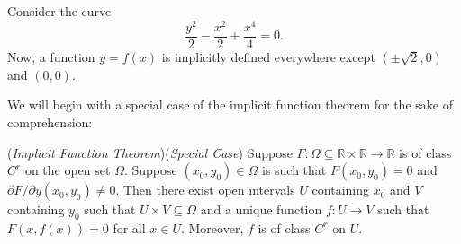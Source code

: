 \documentclass[11pt]{article}
\theoremstyle{definition}
\newcommand{\R}{\mathbb{R}}                      %
\newcommand{\dell}{\partial}
\begin{document}
\ex Consider the curve
$$
\frac{y^2}{2}-\frac{x^2}{2}+\frac{x^4}{4}=0.
$$
Now, a function $y=f(x)$ is implicitly defined everywhere except $(\pm \sqrt{2},0)$ and $(0,0)$.

We will begin with a special case of the implicit function theorem for the sake of comprehension:

\begin{shaded}
\theorem (\textit{Implicit Function Theorem})(\textit{Special Case}) Suppose $F:\Omega\subseteq \R\times \R \to \R$ is of class $C^r$ on the open set $\Omega$. Suppose $(x_0,y_0)\in \Omega$  is such that  $F(x_0,y_0)=0$ and $\dell F/ \dell y (x_0,y_0)\neq 0$. Then there exist open intervals $U$ containing $x_0$ and $V$ containing $y_0$ such that $U\times V \subseteq \Omega$ and a unique function $f:U\to V$ such that $F(x,f(x))=0$ for all $x\in U$. Moreover, $f$ is of class $C^r$ on $U$.
\end{shaded}
\end{document}
